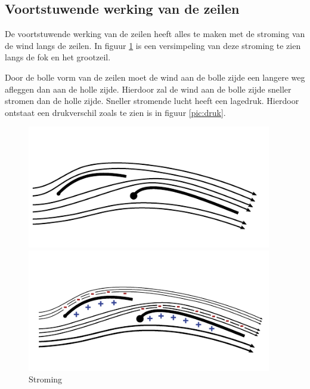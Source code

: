 \subsection*{Voortstuwende werking van de zeilen}
De voortstuwende werking van de zeilen heeft alles te maken met de stroming van de wind langs de zeilen. In figuur \ref{pic:stroming} is een versimpeling van deze stroming te zien langs de fok en het grootzeil. 

Door de bolle vorm van de zeilen moet de wind aan de bolle zijde een langere weg afleggen dan aan de holle zijde. Hierdoor zal de wind aan de bolle zijde sneller stromen dan de holle zijde. Sneller stromende lucht heeft een lagedruk. Hierdoor ontstaat een drukverschil zoals te zien is in figuur \ref{pic:druk}.

\begin{figure}[H]
	\centering
	\begin{minipage}[b]{0.32\textwidth}
		\centering
		\includegraphics[width=0.95\textwidth]{Hoofdstukken/Krachten/pdf/voortstuwing_zeil_stroming.pdf}
		\caption{Stroming}
		\label{pic:stroming}
	\end{minipage}
	\hfill
	\begin{minipage}[b]{0.32\textwidth}
		\centering
		\includegraphics[width=0.95\textwidth]{Hoofdstukken/Krachten/pdf/voortstuwing_zeil_druk.pdf}

\end{minipage}
\end{figure}

